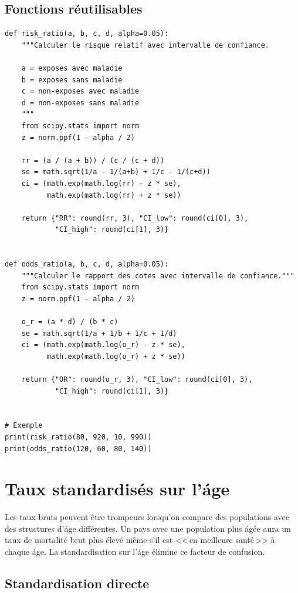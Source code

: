 \subsection{Fonctions r\'eutilisables}

\begin{verbatim}
def risk_ratio(a, b, c, d, alpha=0.05):
    """Calculer le risque relatif avec intervalle de confiance.

    a = exposes avec maladie
    b = exposes sans maladie
    c = non-exposes avec maladie
    d = non-exposes sans maladie
    """
    from scipy.stats import norm
    z = norm.ppf(1 - alpha / 2)

    rr = (a / (a + b)) / (c / (c + d))
    se = math.sqrt(1/a - 1/(a+b) + 1/c - 1/(c+d))
    ci = (math.exp(math.log(rr) - z * se),
          math.exp(math.log(rr) + z * se))

    return {"RR": round(rr, 3), "CI_low": round(ci[0], 3),
            "CI_high": round(ci[1], 3)}


def odds_ratio(a, b, c, d, alpha=0.05):
    """Calculer le rapport des cotes avec intervalle de confiance."""
    from scipy.stats import norm
    z = norm.ppf(1 - alpha / 2)

    o_r = (a * d) / (b * c)
    se = math.sqrt(1/a + 1/b + 1/c + 1/d)
    ci = (math.exp(math.log(o_r) - z * se),
          math.exp(math.log(o_r) + z * se))

    return {"OR": round(o_r, 3), "CI_low": round(ci[0], 3),
            "CI_high": round(ci[1], 3)}


# Exemple
print(risk_ratio(80, 920, 10, 990))
print(odds_ratio(120, 60, 80, 140))
\end{verbatim}

\section{Taux standardis\'es sur l'\'age}

Les taux bruts peuvent \^etre trompeurs lorsqu'on compare des populations avec des structures d'\'age diff\'erentes. Un pays avec une population plus \'ag\'ee aura un taux de mortalit\'e brut plus \'elev\'e m\^eme s'il est <<\,en meilleure sant\'e\,>> \`a chaque \'age. La standardisation sur l'\'age \'elimine ce facteur de confusion.

\subsection{Standardisation directe}

